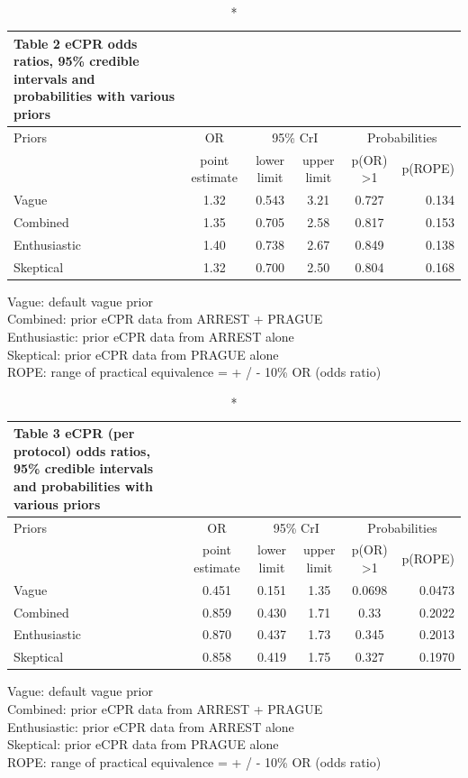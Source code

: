 \documentclass[
  super,
  preprint,
  3p]{elsarticle}
\begin{document}
\setlength{\LTpost}{0mm}
\begin{longtable}{lccccr}
\caption*{
{\large Table 2 eCPR odds ratios, 95\% credible intervals and probabilities with various priors}
} \\ 
\toprule
Priors & OR & \multicolumn{2}{c}{95\% CrI} & \multicolumn{2}{c}{Probabilities} \\ 
\cmidrule(lr){1-1} \cmidrule(lr){2-2} \cmidrule(lr){3-4} \cmidrule(lr){5-6}
 & point estimate & lower limit & upper limit & p(OR) >1  &  p(ROPE) \\ 
\midrule
Vague & 1.32 & 0.543 & 3.21 & 0.727 & 0.134 \\ 
Combined & 1.35 & 0.705 & 2.58 & 0.817 & 0.153 \\ 
Enthusiastic & 1.40 & 0.738 & 2.67 & 0.849 & 0.138 \\ 
Skeptical & 1.32 & 0.700 & 2.50 & 0.804 & 0.168 \\ 
\bottomrule
\end{longtable}
\begin{minipage}{\linewidth}
Vague: default vague prior\\
Combined: prior eCPR data from ARREST + PRAGUE\\
Enthusiastic: prior eCPR data from ARREST alone\\
Skeptical: prior eCPR data from PRAGUE alone\\
ROPE: range of practical equivalence = + / - 10\% OR (odds ratio)\\
\end{minipage}

\setlength{\LTpost}{0mm}
\begin{longtable}{lccccr}
\caption*{
{\large Table 3 eCPR (per protocol) odds ratios, 95\% credible intervals and probabilities with various priors}
} \\ 
\toprule
Priors & OR & \multicolumn{2}{c}{95\% CrI} & \multicolumn{2}{c}{Probabilities} \\ 
\cmidrule(lr){1-1} \cmidrule(lr){2-2} \cmidrule(lr){3-4} \cmidrule(lr){5-6}
 & point estimate & lower limit & upper limit & p(OR) >1  &  p(ROPE) \\ 
\midrule
Vague & 0.451 & 0.151 & 1.35 & 0.0698 & 0.0473 \\ 
Combined & 0.859 & 0.430 & 1.71 & 0.33 & 0.2022 \\ 
Enthusiastic & 0.870 & 0.437 & 1.73 & 0.345 & 0.2013 \\ 
Skeptical & 0.858 & 0.419 & 1.75 & 0.327 & 0.1970 \\ 
\bottomrule
\end{longtable}
\begin{minipage}{\linewidth}
Vague: default vague prior\\
Combined: prior eCPR data from ARREST + PRAGUE\\
Enthusiastic: prior eCPR data from ARREST alone\\
Skeptical: prior eCPR data from PRAGUE alone\\
ROPE: range of practical equivalence = + / - 10\% OR (odds ratio)\\
\end{minipage}
\end{document}
